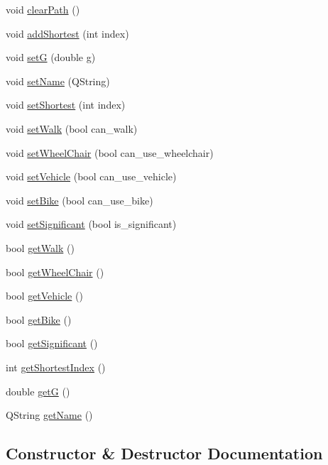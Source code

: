 \begin{DoxyCompactItemize}
\item 
void \hyperlink{class_node_a51ce8bc7a3ba45f6f00786c86a6faf98}{clear\+Path} ()
\item 
void \hyperlink{class_node_aa6793c8602d1eac9bf607a31f211e7d6}{add\+Shortest} (int index)
\item 
void \hyperlink{class_node_ad1afa5efd6957260d42461f69e73e15a}{set\+G} (double g)
\item 
void \hyperlink{class_node_addb57e0f49c6932d6f22113cf619fc77}{set\+Name} (Q\+String)
\item 
void \hyperlink{class_node_ac5c9dd1fca93a21d2c6129effbff6858}{set\+Shortest} (int index)
\item 
void \hyperlink{class_node_ac9ded29bfb053ac29a079e5b5245ed6f}{set\+Walk} (bool can\+\_\+walk)
\item 
void \hyperlink{class_node_a2c0dde616e9ae77e41651f360f749a01}{set\+Wheel\+Chair} (bool can\+\_\+use\+\_\+wheelchair)
\item 
void \hyperlink{class_node_a53b96a3e4b308fb2341bd2deb9bd67f8}{set\+Vehicle} (bool can\+\_\+use\+\_\+vehicle)
\item 
void \hyperlink{class_node_a37b35600090351e21a14c31da3a87608}{set\+Bike} (bool can\+\_\+use\+\_\+bike)
\item 
void \hyperlink{class_node_aba018fe96bda85bdb5622f9bba028544}{set\+Significant} (bool is\+\_\+significant)
\item 
bool \hyperlink{class_node_a46b7ce42590a66f6d821e87573cf0b3b}{get\+Walk} ()
\item 
bool \hyperlink{class_node_ac8c6661c30aef004533beffcfdf38446}{get\+Wheel\+Chair} ()
\item 
bool \hyperlink{class_node_a704affca507888f7c403844ec3d499df}{get\+Vehicle} ()
\item 
bool \hyperlink{class_node_af7b83705d864f9b7a1c3ed200602be0d}{get\+Bike} ()
\item 
bool \hyperlink{class_node_a5da12d36c1ea1f15604d43d204508bda}{get\+Significant} ()
\item 
int \hyperlink{class_node_ae42f77a51fbfff74015deb7099f9ee70}{get\+Shortest\+Index} ()
\item 
double \hyperlink{class_node_a244bcf133f22caea64661601fdbf1b76}{get\+G} ()
\item 
Q\+String \hyperlink{class_node_a28741cff4abc73ba167bcd935ef00add}{get\+Name} ()
\end{DoxyCompactItemize}


\subsection{Constructor \& Destructor Documentation}
\hypertarget{class_node_ad7a34779cad45d997bfd6d3d8043c75f}{}
